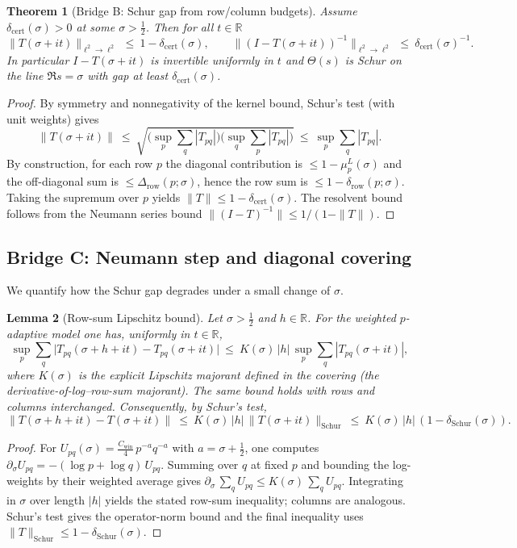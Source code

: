 \documentclass[11pt]{article}
\newtheorem{theorem}{Theorem}
\newtheorem{lemma}[theorem]{Lemma}
\theoremstyle{definition}
\theoremstyle{remark}
\newcommand{\R}{\mathbb{R}}
\begin{document}
\begin{theorem}[Bridge B: Schur gap from row/column budgets]\label{thm:bridge-B}
Assume $\delta_{\mathrm{cert}}(\sigma)>0$ at some $\sigma>\tfrac12$. Then for all $t\in\R$
\[
  \|T(\sigma+it)\|_{\ell^2\to\ell^2}\ \le\ 1-\delta_{\mathrm{cert}}(\sigma),\qquad
  \|(I-T(\sigma+it))^{-1}\|_{\ell^2\to\ell^2}\ \le\ \delta_{\mathrm{cert}}(\sigma)^{-1}.
\]
In particular $I-T(\sigma+it)$ is invertible uniformly in $t$ and $\Theta(s)$ is Schur on the line $\Re s=\sigma$ with gap at least $\delta_{\mathrm{cert}}(\sigma)$.
\end{theorem}
\begin{proof}
By symmetry and nonnegativity of the kernel bound, Schur's test (with unit weights) gives
\[
  \|T(\sigma+it)\|\ \le\ \sqrt{\big(\sup_p \sum_q |T_{pq}|\big)\big(\sup_q \sum_p |T_{pq}|\big)}\ \le\ \sup_p \sum_q |T_{pq}|.
\]
By construction, for each row $p$ the diagonal contribution is $\le 1-\mu_p^L(\sigma)$ and the off-diagonal sum is $\le \Delta_{\mathrm{row}}(p;\sigma)$, hence the row sum is $\le 1-\delta_{\mathrm{row}}(p;\sigma)$. Taking the supremum over $p$ yields $\|T\|\le 1-\delta_{\mathrm{cert}}(\sigma)$. The resolvent bound follows from the Neumann series bound $\|(I-T)^{-1}\|\le 1/(1-\|T\|)$.
\end{proof}

\subsection*{Bridge C: Neumann step and diagonal covering}

We quantify how the Schur gap degrades under a small change of $\sigma$.

\begin{lemma}[Row-sum Lipschitz bound]\label{lem:rowsum-lip}
Let $\sigma>\tfrac12$ and $h\in\R$. For the weighted $p$-adaptive model one has, uniformly in $t\in\R$,
\[
  \sup_p \sum_q \big| T_{pq}(\sigma+h+it)-T_{pq}(\sigma+it)\big|\ \le\ K(\sigma)\,|h|\,\sup_p \sum_q |T_{pq}(\sigma+it)|,
\]
where $K(\sigma)$ is the explicit Lipschitz majorant defined in the covering (the derivative-of-log–row-sum majorant). The same bound holds with rows and columns interchanged. Consequently, by Schur's test,
\[
  \|T(\sigma+h+it)-T(\sigma+it)\|\ \le\ K(\sigma)\,|h|\,\|T(\sigma+it)\|_{\mathrm{Schur}}\ \le\ K(\sigma)\,|h|\,(1-\delta_{\mathrm{Schur}}(\sigma)).
\]
\end{lemma}
\begin{proof}
For $U_{pq}(\sigma)=\frac{C_{\mathrm{win}}}{4}\,p^{-a}q^{-a}$ with $a=\sigma+\tfrac12$, one computes $\partial_\sigma U_{pq}=-(\log p+\log q)\,U_{pq}$. Summing over $q$ at fixed $p$ and bounding the log-weights by their weighted average gives $\partial_\sigma\,\sum_q U_{pq}\le K(\sigma)\,\sum_q U_{pq}$. Integrating in $\sigma$ over length $|h|$ yields the stated row-sum inequality; columns are analogous. Schur's test gives the operator-norm bound and the final inequality uses $\|T\|_{\mathrm{Schur}}\le 1-\delta_{\mathrm{Schur}}(\sigma)$.
\end{proof}
\end{document}
